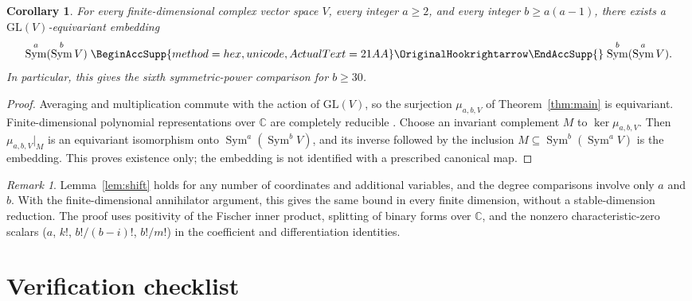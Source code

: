 \documentclass[11pt]{article}
\renewcommand{\hookrightarrow}{\mathrel{
  \BeginAccSupp{method=hex,unicode,ActualText=21AA}
  \OriginalHookrightarrow\EndAccSupp{}}}
\newtheorem{corollary}[theorem]{Corollary}
\theoremstyle{remark}
\newtheorem{remark}[theorem]{Remark}
\DeclareMathOperator{\Sym}{Sym}
\newcommand{\C}{\mathbb C}
\begin{document}
\begin{corollary}\label{cor:comparison}
For every finite-dimensional complex vector space $V$, every integer
$a\ge2$, and every integer $b\ge a(a-1)$, there exists a
$\mathrm{GL}(V)$-equivariant embedding
\[
 \Sym^a(\Sym^b V)\hookrightarrow\Sym^b(\Sym^a V).
\]
In particular, this gives the sixth symmetric-power comparison for $b\ge30$.
\end{corollary}

\begin{proof}
Averaging and multiplication commute with the action of $\mathrm{GL}(V)$, so
the surjection $\mu_{a,b,V}$ of Theorem~\ref{thm:main} is equivariant.
Finite-dimensional polynomial representations over $\C$ are completely
reducible \cite[Chapter~I, Appendix~A, Sections~7--8]{Macdonald}. Choose an
invariant complement $M$ to $\ker\mu_{a,b,V}$. Then $\mu_{a,b,V}|_M$ is an
equivariant isomorphism onto $\Sym^a(\Sym^bV)$, and its inverse followed by
the inclusion $M\subseteq\Sym^b(\Sym^aV)$ is the embedding. This proves
existence only; the embedding is not identified with a prescribed canonical
map.
\end{proof}

\begin{remark}
Lemma~\ref{lem:shift} holds for any number of coordinates and additional
variables, and the degree comparisons involve only $a$ and $b$. With the
finite-dimensional annihilator argument, this gives the same bound in every
finite dimension, without a stable-dimension reduction. The proof uses
positivity of the Fischer inner product, splitting of binary forms over
$\C$, and the nonzero characteristic-zero scalars ($a$, $k!$, $b!/(b-i)!$,
$b!/m!$) in the coefficient and differentiation identities.
\end{remark}

\section{Verification checklist}
\end{document}
